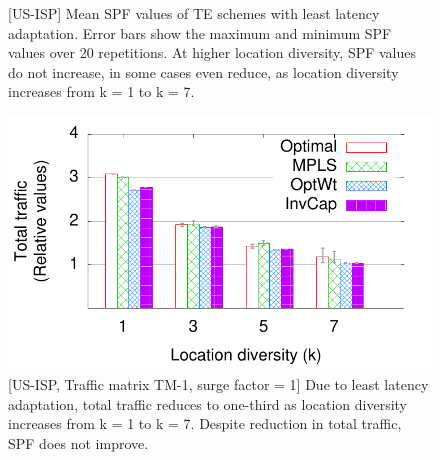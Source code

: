 \begin{figure}[t]
\begin{center}
 \end{center}
 \vspace{-0.2in}
\caption{\label{fig:latency_adapt} [US-ISP] Mean SPF values of TE schemes with least latency adaptation. Error bars show the maximum and minimum SPF values over 20 repetitions. At higher location diversity, SPF values do not increase, in some cases even reduce, as location diversity increases from k = 1 to k = 7.}
\vspace{-0.2in}
\label{fig:leastlatspf}
\end{figure}


\begin{figure}[t] 
\begin{center}
\includegraphics[scale=0.5]{newimages/ATT2/TM27_totalTraffic.pdf}
\end{center}
\vspace{-0.2in}
\caption{\label{fig:latency_adapt} [US-ISP, Traffic matrix TM-1, surge factor = 1]  Due to least latency adaptation, total traffic reduces to one-third as location diversity increases from k = 1 to k = 7.  Despite reduction in total traffic, SPF does not improve.}
\vspace{-0.2in}
\label{fig:totaltraffic}
\end{figure}




